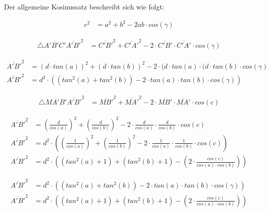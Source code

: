 \begin{refsection}
Der allgemeine Kosinussatz beschreibt sich wie folgt:

\begin{align*}
c^{ 2 } &= a^{ 2 } + b^{ 2 } - 2ab \cdot cos(\gamma)
\end{align*}

\begin{align*}
\triangle \overline{A'B'C' }
\overline{ A'B' }^{ 2 } &= \overline{ C'B' }^{ 2 } + \overline{ C'A' }^{ 2 } - 2 \cdot \overline{ C'B' } \cdot \overline{ C'A' } \cdot cos(\gamma)
\end{align*}



\begin{align*}
\overline{A'B'}^{ 2 } &= (d\cdot tan(a))^{ 2 } + (d\cdot tan(b))^{ 2 } - 2 \cdot (d\cdot tan(a) \cdot (d\cdot tan(b) \cdot cos(\gamma)\\
\overline{A'B'}^{ 2 } &= d^{ 2 } \cdot \left(\left(tan^{ 2 }(a) + tan^{ 2 }(b)\right) - 2\cdot tan(a) \cdot tan(b) \cdot cos(\gamma)\right)
\end{align*}

\begin{align*}
\triangle \overline{ MA'B' }
\overline{ A'B' }^{ 2 } &= \overline{ MB' }^{ 2 } + \overline{ MA' }^{ 2 } - 2\cdot \overline{ MB'} \cdot \overline{ MA' } \cdot cos(c)
\end{align*}


\begin{align*}
\overline{ A'B'}^{ 2 } &= \left(\frac{ d }{ cos(a) }  \right)^{ 2 } + \left(\frac{ d }{ cos(b)}  \right)^{ 2 } - 2 \cdot \frac{ d }{ cos(a)} \cdot \frac{ d }{ cos(b)} \cdot cos(c) \\
\overline{ A'B' }^{ 2 } &= d^{ 2 } \cdot \left(\left(\frac{ 1 }{ cos(a) }  \right)^{ 2 } + \left(\frac{ 1 }{ cos(b) }  \right)^{ 2 } - 2 \cdot \frac{ 1 }{ cos(a)} \cdot \frac{ 1 }{ cos(b)} \cdot cos(c)\right)\\
\overline{ A'B' }^{ 2 } &= d^{ 2 } \cdot \left(\left(tan^{ 2 }(a) + 1\right) + \left(tan^{ 2 }(b) + 1\right) - \left(2 \cdot \frac{cos(c)}{cos(a) \cdot cos(b)}\right)\right)
\end{align*}



\begin{align*}
\overline{ A'B'}^{ 2 } &= d^{ 2 } \cdot \left(\left(tan^{ 2 }(a) + tan^{ 2 }(b)\right) - 2 \cdot tan(a) \cdot tan(b) \cdot cos(\gamma)\right) \\
\overline{ A'B'}^{ 2 } &= d^{ 2 } \cdot \left(\left(tan^{ 2 }(a) + 1\right) + \left(tan^{ 2 }(b) + 1\right) - \left(2 \cdot \frac{cos(c)}{cos(a) \cdot cos(b)}\right)\right)
\end{align*}


\end{refsection}
